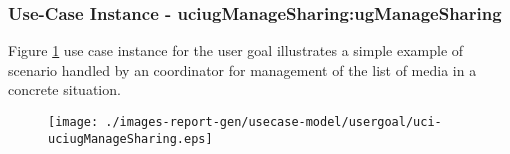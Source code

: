 
	\subsubsection{Use-Case Instance - uciugManageSharing:ugManageSharing}
	

	
	Figure \ref{fig:lu.uni.lassy.excalibur.icrash-spec-RE-UC-uci-uciugManageSharing}
	use case instance for the user goal  illustrates a simple example of scenario handled by an coordinator for management of the list of media in a concrete situation.
	
	\begin{figure}[htbp]
	\begin{center}
	
	\texttt{[image: ./images-report-gen/usecase-model/usergoal/uci-uciugManageSharing.eps]}
	\end{center}
	\caption[lu.uni.lassy.excalibur.icrash-spec Sequence Diagram: uci-uciugManageSharing]{}
	\label{fig:lu.uni.lassy.excalibur.icrash-spec-RE-UC-uci-uciugManageSharing}
	\end{figure}
	\vspace{0.5cm}
